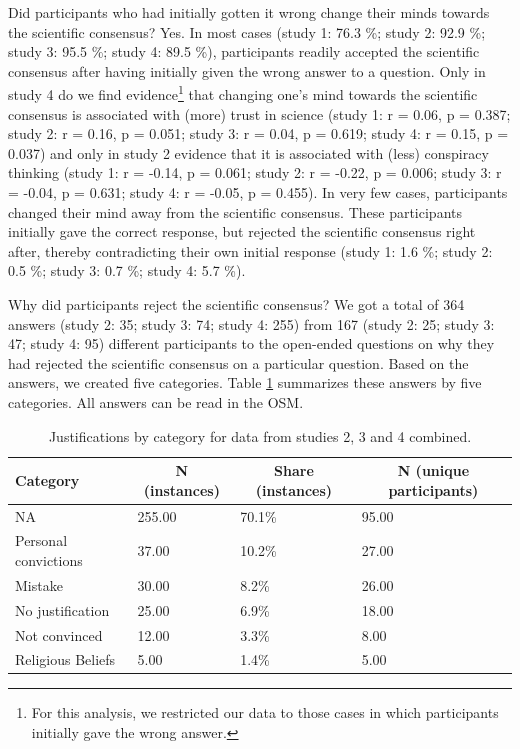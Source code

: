 \documentclass[
  doc,floatsintext]{apa6}
\begin{document}
Did participants who had initially gotten it wrong change their minds towards the scientific consensus? Yes. In most cases (study 1: 76.3 \%; study 2: 92.9 \%; study 3: 95.5 \%; study 4: 89.5 \%), participants readily accepted the scientific consensus after having initially given the wrong answer to a question. Only in study 4 do we find evidence\footnote{For this analysis, we restricted our data to those cases in which participants initially gave the wrong answer.} that changing one's mind towards the scientific consensus is associated with (more) trust in science (study 1: r = 0.06, p = 0.387; study 2: r = 0.16, p = 0.051; study 3: r = 0.04, p = 0.619; study 4: r = 0.15, p = 0.037) and only in study 2 evidence that it is associated with (less) conspiracy thinking (study 1: r = -0.14, p = 0.061; study 2: r = -0.22, p = 0.006; study 3: r = -0.04, p = 0.631; study 4: r = -0.05, p = 0.455). In very few cases, participants changed their mind away from the scientific consensus. These participants initially gave the correct response, but rejected the scientific consensus right after, thereby contradicting their own initial response (study 1: 1.6 \%; study 2: 0.5 \%; study 3: 0.7 \%; study 4: 5.7 \%).

Why did participants reject the scientific consensus? We got a total of 364 answers (study 2: 35; study 3: 74; study 4: 255) from 167 (study 2: 25; study 3: 47; study 4: 95) different participants to the open-ended questions on why they had rejected the scientific consensus on a particular question. Based on the answers, we created five categories. Table \ref{tab:justifications} summarizes these answers by five categories. All answers can be read in the OSM.

\begin{table}[tbp]

\begin{center}
\begin{threeparttable}

\caption{\label{tab:justifications}Justifications by category for data from studies 2, 3 and 4 combined.}

\begin{tabular}{llll}
\toprule
Category & \multicolumn{1}{c}{N (instances)} & \multicolumn{1}{c}{Share (instances)} & \multicolumn{1}{c}{N (unique participants)}\\
\midrule
NA & 255.00 & 70.1\% & 95.00\\
Personal convictions & 37.00 & 10.2\% & 27.00\\
Mistake & 30.00 & 8.2\% & 26.00\\
No justification & 25.00 & 6.9\% & 18.00\\
Not convinced & 12.00 & 3.3\% & 8.00\\
Religious Beliefs & 5.00 & 1.4\% & 5.00\\
\bottomrule
\end{tabular}

\end{threeparttable}
\end{center}

\end{table}
\end{document}
